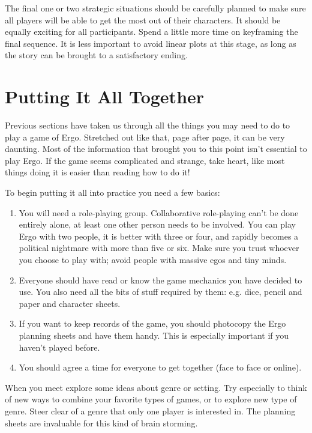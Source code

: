 \documentclass[twoside]{book}
\begin{document}
The final one or two strategic situations should be carefully planned
to make sure all players will be able to get the most out of their
characters. It should be equally exciting for all participants. Spend
a little more time on keyframing the final sequence. It is less
important to avoid linear plots at this stage, as long as the story
can be brought to a satisfactory ending.

\section{Putting It All Together}

Previous sections have taken us through all the things you may need to
do to play a game of Ergo. Stretched out like that, page after page,
it can be very daunting. Most of the information that brought you to
this point isn't essential to play Ergo. If the game seems complicated
and strange, take heart, like most things doing it is easier than
reading how to do it!

To begin putting it all into practice you need a few basics:

\begin{enumerate}

\item  You will need a role-playing group. Collaborative role-playing
   can't be done entirely alone, at least one other person needs to be
   involved. You can play Ergo with two people, it is better with
   three or four, and rapidly becomes a political nightmare with more
   than five or six. Make sure you trust whoever you choose to play
   with; avoid people with massive egos and tiny minds.

\item   Everyone should have read or know the game mechanics you have
   decided to use. You also need all the bits of stuff required by
   them: e.g. dice, pencil and paper and character sheets.

\item   If you want to keep records of the game, you should photocopy the
   Ergo planning sheets and have them handy. This is especially
   important if you haven't played before.

\item   You should agree a time for everyone to get together (face to face
   or online).
\end{enumerate}

When you meet explore some ideas about genre or setting. Try
especially to think of new ways to combine your favorite types of
games, or to explore new type of genre. Steer clear of a genre that
only one player is interested in. The planning sheets are invaluable
for this kind of brain storming.
\end{document}
